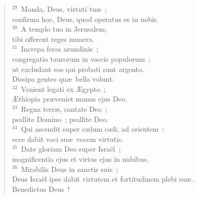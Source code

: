 \begin{flushleft}
\begin{verse}
${}^{29}$~Manda, Deus, virtuti tu\ae~;\\ confirma hoc, Deus, quod operatus es in nobis.\\
${}^{30}$~A templo tuo in Jerusalem,\\ tibi offerent reges munera.\\
${}^{31}$~Increpa feras arundinis~;\\ congregatio taurorum in vaccis populorum~:\\ ut excludant eos qui probati sunt argento.\\ Dissipa gentes qu\ae\ bella volunt.\\
${}^{32}$~Venient legati ex \AE gypto~;\\ \AE thiopia pr\ae veniet manus ejus Deo.\\
${}^{33}$~Regna terr\ae , cantate Deo~;\\ psallite Domino~; psallite Deo.\\
${}^{34}$~Qui ascendit super c\ae lum c\ae li, ad orientem~:\\ ecce dabit voci su\ae\ vocem virtutis.\\
${}^{35}$~Date gloriam Deo super Isra\"el~;\\ magnificentia ejus et virtus ejus in nubibus.\\
${}^{36}$~Mirabilis Deus in sanctis suis~;\\ Deus Isra\"el ipse dabit virtutem et fortitudinem plebi su\ae .\\ Benedictus Deus~!\end{verse}\end{flushleft}



